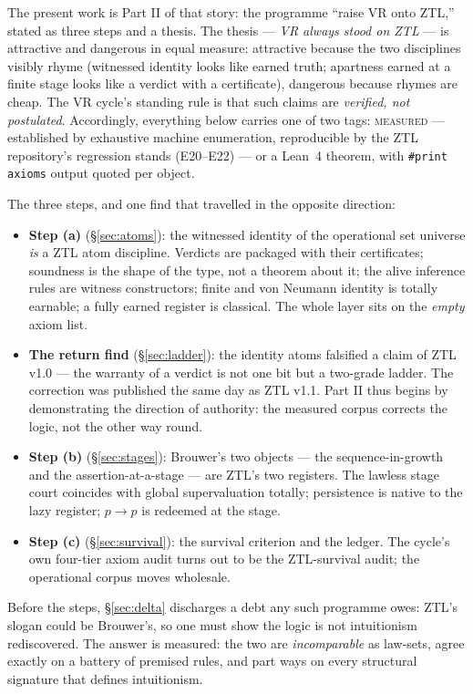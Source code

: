 \documentclass[11pt]{article}
\theoremstyle{remark}
\newcommand{\MEASURED}{\textsc{measured}}
\begin{document}
The present work is Part II of that story: the programme ``raise VR onto
ZTL,'' stated as three steps and a thesis. The thesis ---
\emph{VR always stood on ZTL} --- is attractive and dangerous in equal
measure: attractive because the two disciplines visibly rhyme (witnessed
identity looks like earned truth; apartness earned at a finite stage looks
like a verdict with a certificate), dangerous because rhymes are cheap. The
VR cycle's standing rule is that such claims are \emph{verified, not
postulated}. Accordingly, everything below carries one of two tags:
\MEASURED{} --- established by exhaustive machine enumeration, reproducible
by the ZTL repository's regression stands (E20--E22) --- or a Lean~4
theorem, with \texttt{\#print axioms} output quoted per object.

The three steps, and one find that travelled in the opposite direction:

\begin{itemize}
\item \textbf{Step (a)} (\S\ref{sec:atoms}): the witnessed identity of the
operational set universe \emph{is} a ZTL atom discipline. Verdicts are
packaged with their certificates; soundness is the shape of the type, not a
theorem about it; the alive inference rules are witness constructors; finite
and von Neumann identity is totally earnable; a fully earned register is
classical. The whole layer sits on the \emph{empty} axiom list.
\item \textbf{The return find} (\S\ref{sec:ladder}): the identity atoms
falsified a claim of ZTL v1.0 --- the warranty of a verdict is not one bit
but a two-grade ladder. The correction was published the same day as ZTL
v1.1. Part II thus begins by demonstrating the direction of authority: the
measured corpus corrects the logic, not the other way round.
\item \textbf{Step (b)} (\S\ref{sec:stages}): Brouwer's two objects --- the
sequence-in-growth and the assertion-at-a-stage --- are ZTL's two registers.
The lawless stage court coincides with global supervaluation totally;
persistence is native to the lazy register; $p \to p$ is redeemed at the
stage.
\item \textbf{Step (c)} (\S\ref{sec:survival}): the survival criterion and
the ledger. The cycle's own four-tier axiom audit turns out to be the
ZTL-survival audit; the operational corpus moves wholesale.
\end{itemize}

Before the steps, \S\ref{sec:delta} discharges a debt any such programme
owes: ZTL's slogan could be Brouwer's, so one must show the logic is not
intuitionism rediscovered. The answer is measured: the two are
\emph{incomparable} as law-sets, agree exactly on a battery of premised
rules, and part ways on every structural signature that defines
intuitionism.
\end{document}
